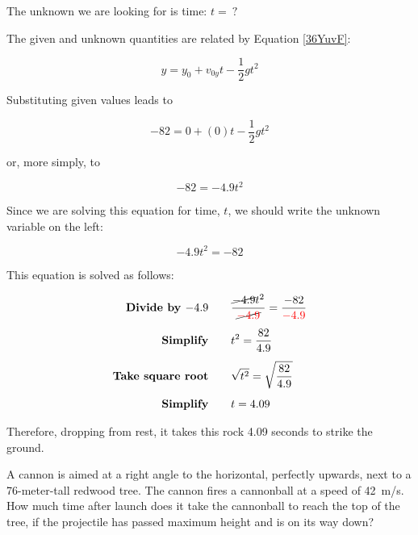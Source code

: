 \documentclass[main.tex]{subfiles}
\begin{document}
\vspace{1em}

The unknown we are looking for is time: $t =\ ?$

\vspace{1em}

The given and unknown quantities are related by Equation \eqref{36YuvF}:

\begin{equation*}
    y = y_0 + v_{0y}t - \frac{1}{2}  g t^2
\end{equation*}

Substituting given values leads to 

\begin{equation*}
    -82 = 0 + (0) t - \frac{1}{2} g t^2
\end{equation*}

or, more simply, to

\begin{equation*}
    -82 = - 4.9 t^2
\end{equation*}

Since we are solving this equation for time, $t$, we should write the unknown variable on the left:

\begin{equation*}
    -4.9 t^2 = -82
\end{equation*}

This equation is solved as follows:

\begin{align*}
    \textbf{Divide by $-4.9$} \qquad & \frac{\cancel{-4.9} t^2}{\cancel{\mathbin{\color{red} -} \textcolor{red}{4.9}}} = \frac{-82}{\mathbin{\color{red} -} \textcolor{red}{4.9}}\\[1ex]
    \textbf{Simplify} \qquad & t^2 = \frac{82}{4.9}\\[1ex]
    \textbf{Take square root} \qquad & \sqrt{t^2} = \sqrt{\frac{82}{4.9}}\\[1ex]
    \textbf{Simplify} \qquad & t = 4.09
\end{align*}

Therefore, dropping from rest, it takes this rock 4.09 seconds to strike the ground.

\endsolution


\begin{example} \label{lB7EDG}
    A cannon is aimed at a right angle to the horizontal, perfectly upwards, next to a 76-meter-tall redwood tree. The cannon fires a cannonball at a speed of \SI{42}{m/s}. How much time after launch does it take the cannonball to reach the top of the tree, if the projectile has passed maximum height and is on its way down?
\end{example}
\end{document}
